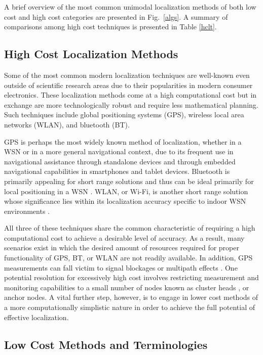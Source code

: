 \documentclass[12pt]{uthesis-v12}  %
\begin{document}
A brief overview of the most common unimodal localization methods of both low cost and high cost categories are presented in Fig.~\ref{algs}. A summary of comparisons among high cost techniques is presented in Table \ref{hclt}.

\subsection{High Cost Localization Methods}

Some of the most common modern localization techniques are well-known even outside of scientific research areas due to their popularities in modern consumer electronics. These localization methods come at a high computational cost but in exchange are more technologically robust and require less mathematical planning. Such techniques include global positioning systems (GPS), wireless local area networks (WLAN), and bluetooth (BT).

GPS is perhaps the most widely known method of localization, whether in a WSN or in a more general navigational context, due to its frequent use in navigational assistance through standalone devices and through embedded navigational capabilities in smartphones and tablet devices. Bluetooth is primarily appealing for short range solutions and thus can be ideal primarily for local positioning in a WSN \cite{shen}. WLAN, or Wi-Fi, is another short range solution whose significance lies within its localization accuracy specific to indoor WSN environments \cite{shen}.

All three of these techniques share the common characteristic of requiring a high computational cost to achieve a desirable level of accuracy. As a result, many scenarios exist in which the desired amount of resources required for proper functionality of GPS, BT, or WLAN are not readily available. In addition, GPS measurements can fall victim to signal blockages or multipath effects \cite{bhatt}. One potential resolution for excessively high cost involves restricting measurement and monitoring capabilities to a small number of nodes known as cluster heads \cite{dhan,desh}, or anchor nodes. A vital further step, however, is to engage in lower cost methods of a more computationally simplistic nature in order to achieve the full potential of effective localization.

\subsection{Low Cost Methods and Terminologies}
\end{document}
